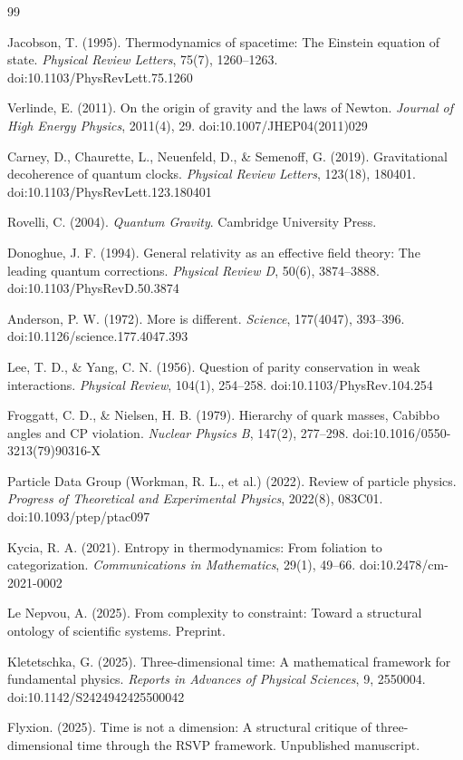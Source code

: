 \documentclass[11pt]{article}
\begin{document}
\newpage
\begin{thebibliography}{99}

Jacobson, T. (1995).
\newblock Thermodynamics of spacetime: The Einstein equation of state.
\newblock \emph{Physical Review Letters}, 75(7), 1260--1263.
\newblock doi:10.1103/PhysRevLett.75.1260

Verlinde, E. (2011).
\newblock On the origin of gravity and the laws of Newton.
\newblock \emph{Journal of High Energy Physics}, 2011(4), 29.
\newblock doi:10.1007/JHEP04(2011)029

Carney, D., Chaurette, L., Neuenfeld, D., \& Semenoff, G. (2019).
\newblock Gravitational decoherence of quantum clocks.
\newblock \emph{Physical Review Letters}, 123(18), 180401.
\newblock doi:10.1103/PhysRevLett.123.180401

Rovelli, C. (2004).
\newblock \emph{Quantum Gravity}.
\newblock Cambridge University Press.

Donoghue, J. F. (1994).
\newblock General relativity as an effective field theory: The leading quantum corrections.
\newblock \emph{Physical Review D}, 50(6), 3874--3888.
\newblock doi:10.1103/PhysRevD.50.3874

Anderson, P. W. (1972).
\newblock More is different.
\newblock \emph{Science}, 177(4047), 393--396.
\newblock doi:10.1126/science.177.4047.393

Lee, T. D., \& Yang, C. N. (1956).
\newblock Question of parity conservation in weak interactions.
\newblock \emph{Physical Review}, 104(1), 254--258.
\newblock doi:10.1103/PhysRev.104.254

Froggatt, C. D., \& Nielsen, H. B. (1979).
\newblock Hierarchy of quark masses, Cabibbo angles and CP violation.
\newblock \emph{Nuclear Physics B}, 147(2), 277--298.
\newblock doi:10.1016/0550-3213(79)90316-X

Particle Data Group (Workman, R. L., et al.) (2022).
\newblock Review of particle physics.
\newblock \emph{Progress of Theoretical and Experimental Physics}, 2022(8), 083C01.
\newblock doi:10.1093/ptep/ptac097

Kycia, R. A. (2021).
\newblock Entropy in thermodynamics: From foliation to categorization.
\newblock \emph{Communications in Mathematics}, 29(1), 49--66.
\newblock doi:10.2478/cm-2021-0002

Le Nepvou, A. (2025).
\newblock From complexity to constraint: Toward a structural ontology of scientific systems.
\newblock Preprint.

Kletetschka, G. (2025).
\newblock Three-dimensional time: A mathematical framework for fundamental physics.
\newblock \emph{Reports in Advances of Physical Sciences}, 9, 2550004.
\newblock doi:10.1142/S2424942425500042

Flyxion. (2025).
\newblock Time is not a dimension: A structural critique of three-dimensional time through the RSVP framework.
\newblock Unpublished manuscript.

\end{thebibliography}
\end{document}
